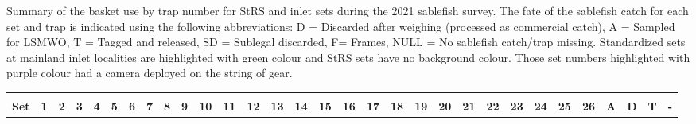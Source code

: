 \documentclass[12pt]{article}\usepackage[]{graphicx}\usepackage[]{color}
\begin{document}
\begin{appendices}
Summary of the basket use by trap number for StRS and inlet sets during the 2021 sablefish survey. The fate of the sablefish catch for each set and trap is indicated using the following abbreviations: D = Discarded after weighing (processed as commercial catch), A = Sampled for LSMWO, T = Tagged and released, SD = Sublegal discarded, F= Frames, NULL = No sablefish catch/trap missing. Standardized sets at mainland inlet localities are highlighted with green colour and StRS sets have no background colour. Those set numbers highlighted with purple colour had a camera deployed on the string of gear.
\begin{landscape}\begingroup\fontsize{6}{8}\selectfont
\begin{longtable}{>{\raggedright\arraybackslash}p{0.8cm}>{\raggedright\arraybackslash}p{0.3cm}>{\raggedright\arraybackslash}p{0.3cm}>{\raggedright\arraybackslash}p{0.3cm}>{\raggedright\arraybackslash}p{0.3cm}>{\raggedright\arraybackslash}p{0.3cm}>{\raggedright\arraybackslash}p{0.3cm}>{\raggedright\arraybackslash}p{0.3cm}>{\raggedright\arraybackslash}p{0.3cm}>{\raggedright\arraybackslash}p{0.3cm}>{\raggedright\arraybackslash}p{0.4cm}>{\raggedright\arraybackslash}p{0.4cm}>{\raggedright\arraybackslash}p{0.4cm}>{\raggedright\arraybackslash}p{0.4cm}>{\raggedright\arraybackslash}p{0.4cm}>{\raggedright\arraybackslash}p{0.4cm}>{\raggedright\arraybackslash}p{0.4cm}>{\raggedright\arraybackslash}p{0.4cm}>{\raggedright\arraybackslash}p{0.4cm}>{\raggedright\arraybackslash}p{0.4cm}>{\raggedright\arraybackslash}p{0.4cm}>{\raggedright\arraybackslash}p{0.4cm}>{\raggedright\arraybackslash}p{0.4cm}>{\raggedright\arraybackslash}p{0.4cm}>{\raggedright\arraybackslash}p{0.4cm}>{\raggedright\arraybackslash}p{0.4cm}>{\raggedright\arraybackslash}p{0.4cm}>{\raggedleft\arraybackslash}p{0.2cm}>{\raggedleft\arraybackslash}p{0.2cm}>{\raggedleft\arraybackslash}p{0.2cm}>{\raggedleft\arraybackslash}p{0.2cm}}
\toprule
\multicolumn{1}{c}{\textbf{ }} & \multicolumn{26}{c}{\textbf{Trap}} & \multicolumn{4}{c}{\textbf{Total}} \\
\cmidrule(l{3pt}r{3pt}){2-27} \cmidrule(l{3pt}r{3pt}){28-31}
\textbf{Set} & \textbf{1} & \textbf{2} & \textbf{3} & \textbf{4} & \textbf{5} & \textbf{6} & \textbf{7} & \textbf{8} & \textbf{9} & \textbf{10} & \textbf{11} & \textbf{12} & \textbf{13} & \textbf{14} & \textbf{15} & \textbf{16} & \textbf{17} & \textbf{18} & \textbf{19} & \textbf{20} & \textbf{21} & \textbf{22} & \textbf{23} & \textbf{24} & \textbf{25} & \textbf{26} & \textbf{A} & \textbf{D} & \textbf{T} & \textbf{-}\\

\end{longtable}
\end{landscape}
\end{appendices}
\end{document}
